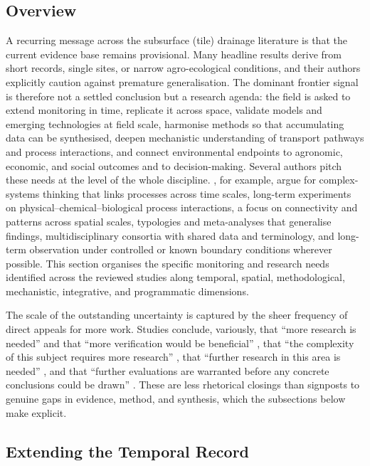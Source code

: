 \subsection{Overview}

A recurring message across the subsurface (tile) drainage literature is that the current evidence base remains provisional. Many headline results derive from short records, single sites, or narrow agro-ecological conditions, and their authors explicitly caution against premature generalisation. The dominant frontier signal is therefore not a settled conclusion but a research agenda: the field is asked to extend monitoring in time, replicate it across space, validate models and emerging technologies at field scale, harmonise methods so that accumulating data can be synthesised, deepen mechanistic understanding of transport pathways and process interactions, and connect environmental endpoints to agronomic, economic, and social outcomes and to decision-making. Several authors pitch these needs at the level of the whole discipline. \textcite{Rogger2017}, for example, argue for complex-systems thinking that links processes across time scales, long-term experiments on physical--chemical--biological process interactions, a focus on connectivity and patterns across spatial scales, typologies and meta-analyses that generalise findings, multidisciplinary consortia with shared data and terminology, and long-term observation under controlled or known boundary conditions wherever possible. This section organises the specific monitoring and research needs identified across the reviewed studies along temporal, spatial, methodological, mechanistic, integrative, and programmatic dimensions.

The scale of the outstanding uncertainty is captured by the sheer frequency of direct appeals for more work. Studies conclude, variously, that ``more research is needed'' and that ``more verification would be beneficial'' \parencite{SHALIT1995}, that ``the complexity of this subject requires more research'' \parencite{Malone2014}, that ``further research in this area is needed'' \parencite{Woo2023}, and that ``further evaluations are warranted before any concrete conclusions could be drawn'' \parencite{GUPTA1993}. These are less rhetorical closings than signposts to genuine gaps in evidence, method, and synthesis, which the subsections below make explicit.

\subsection{Extending the Temporal Record}


